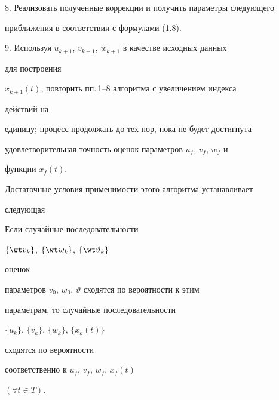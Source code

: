  


8. Реализовать полученные коррекции и получить параметры следующего 


приближения в соответствии с формулами (1.8). 


 


9. Используя $u_{k+1}$, $v_{k+1}$, $w_{k+1}$ в качестве исходных данных 


для построения 


$x_{k+1}(t)$, повторить пп.\,1--8 алгоритма с увеличением индекса 


действий на 


единицу; процесс продолжать до тех пор, пока не будет достигнута 


удовлетворительная точность оценок параметров $u_f$, $v_f$, $w_f$ и 


функции $x_f(t)$. 


 


Достаточные условия применимости этого алгоритма устанавливает 


следующая 


 


\begin{thm} Если случайные последовательности 


$\{\wt v_k\}$, $\{\wt w_k\}$, $\{\wt\vartheta_k\}$ 


оценок 


параметров $v_0$, $w_0$, $\vartheta$ сходятся по вероятности к этим 


параметрам, то случайные последовательности 


$\{u_k\}$, $\{v_k\}$, $\{w_k\}$, $\{x_k(t)\}$ 


сходятся по вероятности 


соответственно к $u_f$, $v_f$, $w_f$, $x_f(t)$ 


$(\forall t\in T)$. 


\end{thm} 


 


